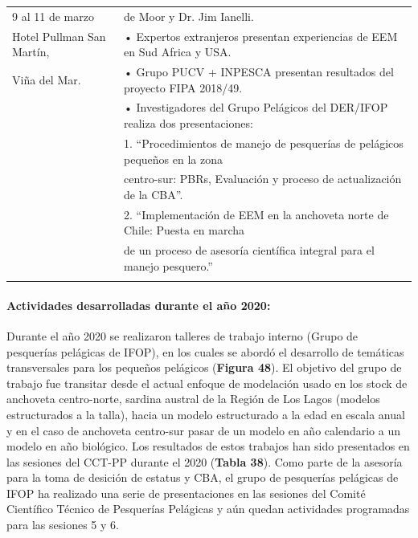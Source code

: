 \documentclass[
  spanish,
]{article}
\begin{document}
\begin{table}[h]
{\begin{tabular}{|l|l|}
    9 al 11 de marzo               & de Moor y Dr. Jim Ianelli. \\
    Hotel Pullman San Martín,    &  •   Expertos extranjeros presentan experiencias de EEM en Sud Africa y USA.\\
    Viña del Mar.                &  •   Grupo PUCV + INPESCA presentan resultados del proyecto FIPA 2018/49. \\
                                 &  •   Investigadores del Grupo Pelágicos del DER/IFOP realiza dos presentaciones: \\
                                 &    1. “Procedimientos de manejo de pesquerías de pelágicos pequeños en la zona \\
                                 &    centro-sur: PBRs, Evaluación y proceso de actualización de la CBA”. \\
                                 &    2. “Implementación de EEM en la anchoveta norte de Chile: Puesta en marcha \\ 
                                 &    de un proceso de asesoría científica integral para el manejo pesquero.” \\ 
                                 & \\ \hline
  \end{tabular}}
    \end{table}

\normalsize

\pagebreak

\hypertarget{actividades-desarrolladas-durante-el-auxf1o-2020}{%
\paragraph{Actividades desarrolladas durante el año
2020:}\label{actividades-desarrolladas-durante-el-auxf1o-2020}}

Durante el año 2020 se realizaron talleres de trabajo interno (Grupo de
pesquerías pelágicas de IFOP), en los cuales se abordó el desarrollo de
temáticas transversales para los pequeños pelágicos (\textbf{Figura
48}). El objetivo del grupo de trabajo fue transitar desde el actual
enfoque de modelación usado en los stock de anchoveta centro-norte,
sardina austral de la Región de Los Lagos (modelos estructurados a la
talla), hacia un modelo estructurado a la edad en escala anual y en el
caso de anchoveta centro-sur pasar de un modelo en año calendario a un
modelo en año biológico. Los resultados de estos trabajos han sido
presentados en las sesiones del CCT-PP durante el 2020 (\textbf{Tabla
38}). Como parte de la asesoría para la toma de desición de estatus y
CBA, el grupo de pesquerías pelágicas de IFOP ha realizado una serie de
presentaciones en las sesiones del Comité Científico Técnico de
Pesquerías Pelágicas y aún quedan actividades programadas para las
sesiones 5 y 6. \vspace{0.5cm}
\end{document}
